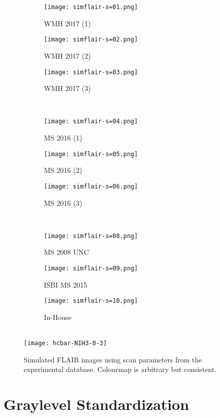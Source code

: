 \begin{figure}
  \centering
  \begin{subfigure}{0.25\textwidth}\centering\texttt{[image: simflair-s=01.png]}\caption{WMH 2017 (1)}\end{subfigure}
  \begin{subfigure}{0.25\textwidth}\centering\texttt{[image: simflair-s=02.png]}\caption{WMH 2017 (2)}\end{subfigure}
  \begin{subfigure}{0.25\textwidth}\centering\texttt{[image: simflair-s=03.png]}\caption{WMH 2017 (3)}\end{subfigure}\\[0.5em]
  \begin{subfigure}{0.25\textwidth}\centering\texttt{[image: simflair-s=04.png]}\caption{MS  2016 (1)}\end{subfigure}
  \begin{subfigure}{0.25\textwidth}\centering\texttt{[image: simflair-s=05.png]}\caption{MS  2016 (2)}\end{subfigure}
  \begin{subfigure}{0.25\textwidth}\centering\texttt{[image: simflair-s=06.png]}\caption{MS  2016 (3)}\end{subfigure}\\[0.5em]
  \begin{subfigure}{0.25\textwidth}\centering\texttt{[image: simflair-s=08.png]}\caption{MS  2008 UNC}\end{subfigure}
  \begin{subfigure}{0.25\textwidth}\centering\texttt{[image: simflair-s=09.png]}\caption{ISBI MS 2015}\end{subfigure}
  \begin{subfigure}{0.25\textwidth}\centering\texttt{[image: simflair-s=10.png]}\caption{In-House    }\end{subfigure}\\[0.5em]
  \texttt{[image: hcbar-NIH3-0-3]}
  \caption{Simulated FLAIR images using scan parameters from the experimental database. Colourmap is arbitrary but consistent.}
  \label{fig:simflair}
\end{figure}
\section{Graylevel Standardization}
